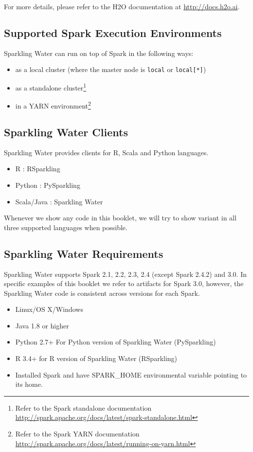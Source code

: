 \documentclass{standalone}
\begin{document}
    For more details, please refer to the H2O documentation at {\url{http://docs.h2o.ai}}.

    \subsection{Supported Spark Execution Environments}

    Sparkling Water can run on top of Spark in the following ways:
    \begin{itemize}
        \item as a local cluster (where the master node is \texttt{local} or \texttt{local[*]})
        \item as a standalone cluster\footnote{Refer to the Spark standalone documentation
        \url{http://spark.apache.org/docs/latest/spark-standalone.html}}
        \item in a YARN environment\footnote{Refer to the Spark YARN documentation \url{http://spark.apache.org/docs/latest/running-on-yarn.html}}
    \end{itemize}

    \subsection{Sparkling Water Clients}

    Sparkling Water provides clients for R, Scala and Python languages.

    \begin{itemize}
        \item R : RSparkling
        \item Python : PySparkling
        \item Scala/Java : Sparkling Water
    \end{itemize}

    Whenever we show any code in this booklet, we will try to show variant in all three supported languages when possible.

    \subsection{Sparkling Water Requirements}

    Sparkling Water supports Spark 2.1, 2.2, 2.3, 2.4 (except Spark 2.4.2) and 3.0. In specific examples of this
    booklet we refer to artifacts for Spark 3.0, however, the Sparkling Water code is consistent across versions
    for each Spark.

    \begin{itemize}
        \item Linux/OS X/Windows
        \item Java 1.8 or higher
        \item Python 2.7+ For Python version of Sparkling Water (PySparkling)
        \item R 3.4+ for R version of Sparkling Water (RSparkling)
        \item Installed Spark and have SPARK\_HOME environmental variable pointing to its home.
    \end{itemize}
\end{document}
